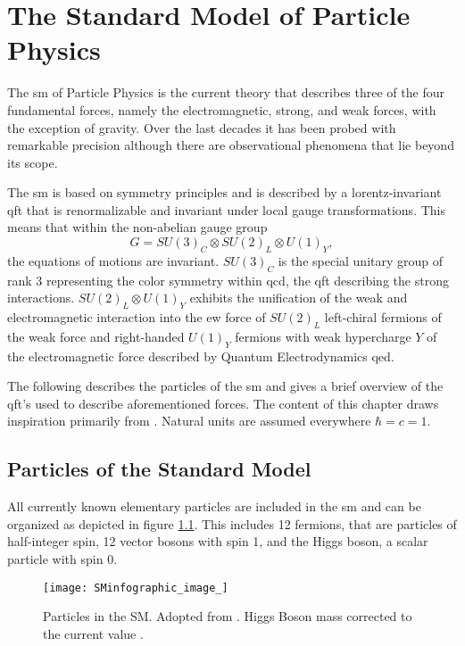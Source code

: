 \chapter{The Standard Model of Particle Physics}\label{ch:sm}
\noindent The \ac{sm} of Particle Physics is the current theory that describes three of the four fundamental forces, namely the electromagnetic, strong, and weak forces, with the exception of gravity. Over the last decades it has been probed with remarkable precision although there are  observational phenomena that lie beyond its scope.

The \ac{sm} is based on symmetry principles and is described by a lorentz-invariant \ac{qft} that is renormalizable and invariant under local gauge transformations. This means that within the non-abelian gauge group
\begin{equation}
    G = SU(3)_C \otimes SU(2)_L \otimes U(1)_Y,
\end{equation}
the equations of motions are invariant. $SU(3)_C$ is the special unitary group of rank 3 representing the color symmetry within \ac{qcd}, the \ac{qft} describing the strong interactions. $SU(2)_L \otimes U(1)_Y$ exhibits the unification of the weak and electromagnetic interaction into the \ac{ew} force of $SU(2)_L$ left-chiral fermions of the weak force and right-handed $U(1)_Y$ fermions with weak hypercharge $Y$ of the electromagnetic force described by Quantum Electrodynamics \ac{qed}.

The following describes the particles of the \ac{sm} and gives a brief overview of the \ac{qft}'s used to describe aforementioned forces. The content of this chapter draws inspiration primarily from \citep{hollik2010quantum,griffiths2020introduction,thomson2013modern,zee2010quantum,halzen1984introductory}. Natural units are assumed everywhere $\hbar=c=1$.


\section{Particles of the Standard Model}

All currently known elementary particles are included in the \ac{sm} and can be organized as depicted in figure \ref{fig:sm}. This includes 12 fermions, that are particles of half-integer spin, 12 vector bosons with spin 1, and the Higgs boson, a scalar particle with spin 0.


\begin{figure}
    \centering
    \texttt{[image: SMinfographic\_image\_]}
    \caption[]{Particles in the SM. Adopted from \citep{smpar}. Higgs Boson mass corrected to the current value \citep{particle2022review}. }
    \label{fig:sm}
\end{figure}


